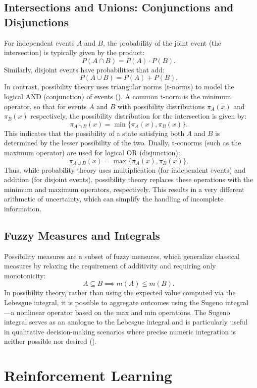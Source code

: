 \documentclass[12pt,a4paper]{report}
\begin{document}
\subsection{Intersections and Unions: Conjunctions and Disjunctions}
For independent events \(A\) and \(B\), the probability of the joint event (the intersection) is typically given by the product:
\[
P(A \cap B) = P(A) \cdot P(B).
\]
Similarly, disjoint events have probabilities that add:
\[
P(A \cup B) = P(A) + P(B).
\]
In contrast, possibility theory uses triangular norms (t-norms) to model the logical AND (conjunction) of events (\cite{DUBOIS01021982}). A common t-norm is the minimum operator, so that for events \(A\) and \(B\) with possibility distributions \( \pi_A(x) \) and \( \pi_B(x) \) respectively, the possibility distribution for the intersection is given by:
\[
\pi_{A \cap B}(x) = \min\{ \pi_A(x), \pi_B(x) \}.
\]
This indicates that the possibility of a state satisfying both \(A\) and \(B\) is determined by the lesser possibility of the two. Dually, t-conorms (such as the maximum operator) are used for logical OR (disjunction):
\[
\pi_{A \cup B}(x) = \max\{ \pi_A(x), \pi_B(x) \}.
\]
Thus, while probability theory uses multiplication (for independent events) and addition (for disjoint events), possibility theory replaces these operations with the minimum and maximum operators, respectively. This results in a very different arithmetic of uncertainty, which can simplify the handling of incomplete information.

\subsection{Fuzzy Measures and Integrals}
Possibility measures are a subset of fuzzy measures, which generalize classical measures by relaxing the requirement of additivity and requiring only monotonicity:
\[
A \subseteq B \implies m(A) \leq m(B).
\]
In possibility theory, rather than using the expected value computed via the Lebesgue integral, it is possible to aggregate outcomes using the Sugeno integral—a nonlinear operator based on the max and min operations. The Sugeno integral serves as an analogue to the Lebesgue integral and is particularly useful in qualitative decision-making scenarios where precise numeric integration is neither possible nor desired (\cite{Dubois:2015}).

\section{Reinforcement Learning}
\end{document}
